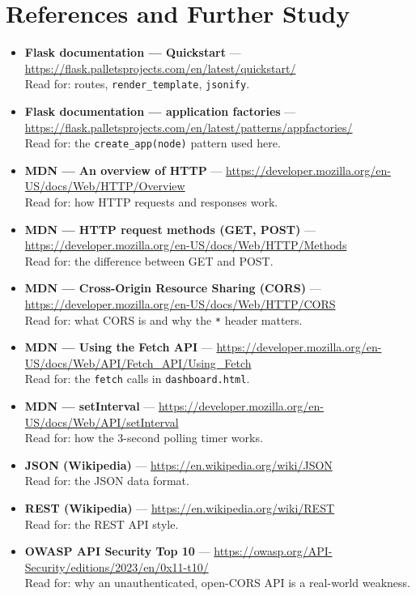 \documentclass[11pt,a4paper]{report}
\begin{document}
\section{References and Further Study}
\begin{itemize}
  \item \textbf{Flask documentation --- Quickstart} ---
        \url{https://flask.palletsprojects.com/en/latest/quickstart/}\\
        Read for: routes, \texttt{render\_template}, \texttt{jsonify}.
  \item \textbf{Flask documentation --- application factories} ---
        \url{https://flask.palletsprojects.com/en/latest/patterns/appfactories/}\\
        Read for: the \texttt{create\_app(node)} pattern used here.
  \item \textbf{MDN --- An overview of HTTP} ---
        \url{https://developer.mozilla.org/en-US/docs/Web/HTTP/Overview}\\
        Read for: how HTTP requests and responses work.
  \item \textbf{MDN --- HTTP request methods (GET, POST)} ---
        \url{https://developer.mozilla.org/en-US/docs/Web/HTTP/Methods}\\
        Read for: the difference between GET and POST.
  \item \textbf{MDN --- Cross-Origin Resource Sharing (CORS)} ---
        \url{https://developer.mozilla.org/en-US/docs/Web/HTTP/CORS}\\
        Read for: what CORS is and why the \texttt{*} header matters.
  \item \textbf{MDN --- Using the Fetch API} ---
        \url{https://developer.mozilla.org/en-US/docs/Web/API/Fetch_API/Using_Fetch}\\
        Read for: the \texttt{fetch} calls in \texttt{dashboard.html}.
  \item \textbf{MDN --- setInterval} ---
        \url{https://developer.mozilla.org/en-US/docs/Web/API/setInterval}\\
        Read for: how the 3-second polling timer works.
  \item \textbf{JSON (Wikipedia)} ---
        \url{https://en.wikipedia.org/wiki/JSON}\\
        Read for: the JSON data format.
  \item \textbf{REST (Wikipedia)} ---
        \url{https://en.wikipedia.org/wiki/REST}\\
        Read for: the REST API style.
  \item \textbf{OWASP API Security Top 10} ---
        \url{https://owasp.org/API-Security/editions/2023/en/0x11-t10/}\\
        Read for: why an unauthenticated, open-CORS API is a real-world weakness.
\end{itemize}
\end{document}
